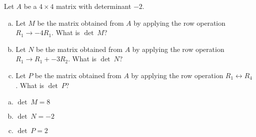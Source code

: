 
\begin{exerciseStatement}


Let \(A\) be a \(4 \times 4\) matrix with determinant \( -2 \).


\begin{enumerate}[(a)]
\item Let \(M\) be the matrix obtained from \(A\) by applying the row operation \( R_1 \to -4R_1 \). What is \(\operatorname{det}\ M\)?
\item Let \(N\) be the matrix obtained from \(A\) by applying the row operation \( R_1 \to R_1 + -3R_2 \). What is \(\operatorname{det}\ N\)?
\item Let \(P\) be the matrix obtained from \(A\) by applying the row operation \( R_1 \leftrightarrow R_4 \). What is \(\operatorname{det}\ P\)?
\end{enumerate}
    
\end{exerciseStatement}
    
\begin{exerciseAnswer} 

\begin{enumerate}[(a)]
\item \(\operatorname{det}\ M= 8 \)
\item \(\operatorname{det}\ N= -2 \)
\item \(\operatorname{det}\ P= 2 \)
\end{enumerate}
    
\end{exerciseAnswer}
    
